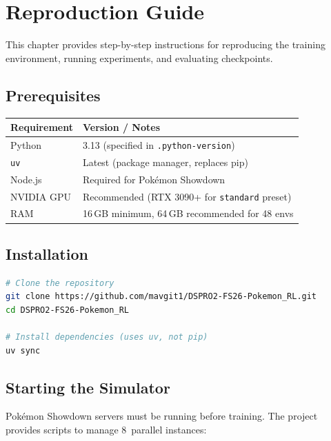 \chapter{Reproduction Guide}
\label{ch:reproduction}

This chapter provides step-by-step instructions for reproducing the training
environment, running experiments, and evaluating checkpoints.

\section{Prerequisites}

\begin{center}
\small
\begin{tabularx}{0.7\textwidth}{l l}
  \toprule
  \textbf{Requirement} & \textbf{Version / Notes} \\
  \midrule
  Python      & 3.13 (specified in \texttt{.python-version}) \\
  \texttt{uv} & Latest (package manager, replaces pip) \\
  Node.js     & Required for Pok\'{e}mon Showdown \\
  NVIDIA GPU  & Recommended (RTX 3090+ for \texttt{standard} preset) \\
  RAM         & 16\,GB minimum, 64\,GB recommended for 48 envs \\
  \bottomrule
\end{tabularx}
\end{center}

\section{Installation}

\begin{lstlisting}[language=bash]
# Clone the repository
git clone https://github.com/mavgit1/DSPRO2-FS26-Pokemon_RL.git
cd DSPRO2-FS26-Pokemon_RL

# Install dependencies (uses uv, not pip)
uv sync
\end{lstlisting}

\section{Starting the Simulator}

Pok\'{e}mon Showdown servers must be running before training.  The project
provides scripts to manage 8~parallel instances:

